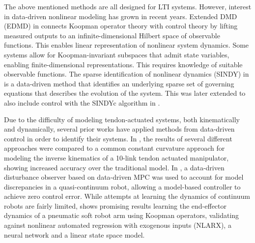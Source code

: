 \documentclass[../main.tex]{subfiles}
\begin{document}
The above mentioned methods are all designed for LTI systems. However, interest in data-driven nonlinear modeling has grown in recent years. Extended DMD (EDMD) in \cite{williams2015} connects Koopman operator theory with control theory by lifting measured outputs to an infinite-dimensional Hilbert space of observable functions. This enables linear representation of nonlinear system dynamics. Some systems allow for Koopman-invariant subspaces that admit state variables, enabling finite-dimensional representations. This requires knowledge of suitable observable functions. The sparse identification of nonlinear dynamics (SINDY) in \cite{brunton2016} is a data-driven method that identifies an underlying sparse set of governing equations that describes the evolution of the system. This was later extended to also include control with the SINDYc algorithm in \cite{brunton2016a}.


Due to the difficulty of modeling tendon-actuated systems, both kinematically and dynamically, several prior works have applied methods from data-driven control in order to identify their systems. In \cite{xu2017}, the results of several different approaches were compared to a common constant curvature approach for modeling the inverse kinematics of a 10-link tendon actuated manipulator, showing increased accuracy over the traditional model. In \cite{Muller2022}, a data-driven disturbance observer based on data-driven MPC was used to account for model discrepancies in a quasi-continuum robot, allowing a model-based controller to achieve zero control error. While attempts at learning the dynamics of continuum robots are fairly limited, \cite{bruder2019} shows promising results learning the end-effector dynamics of a pneumatic soft robot arm using Koopman operators, validating against nonlinear automated regression with exogenous inputs (NLARX), a neural network and a linear state space model.



\end{document}
